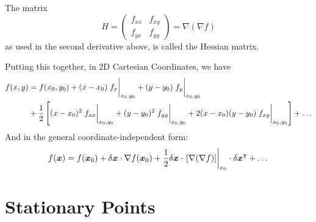 \documentclass{article}
\begin{document}
The matrix
\[ H = \begin{pmatrix}
		f_{xx} & f_{xy} \\
		f_{yx} & f_{yy}
	\end{pmatrix} = \nabla(\nabla f) \]
as used in the second derivative above, is called the Hessian matrix.

Putting this together, in 2D Cartesian Coordinates, we have
\begin{align*}
	f(x, y) & = f(x_0, y_0) + (x-x_0)\eval{f_x}_{x_0, y_0} + (y-y_0)\eval{f_y}_{x_0, y_0} \\&+ \frac{1}{2}\left[ (x-x_0)^2\eval{f_{xx}}_{x_0, y_0} + (y-y_0)^2\eval{f_{yy}}_{x_0, y_0} + 2(x-x_0)(y-y_0)\eval{f_{xy}}_{x_0, y_0} \right] + \dots
\end{align*}
And in the general coordinate-independent form:
\[ f(\bm x) = f(\bm x_0) + \delta \bm x \cdot \nabla f(\bm x_0) + \frac{1}{2}\delta \bm x \cdot \eval{[\nabla (\nabla f)]}_{x_0} \cdot \delta \bm x^\transpose + \dots \]

\section{Stationary Points}
\end{document}

